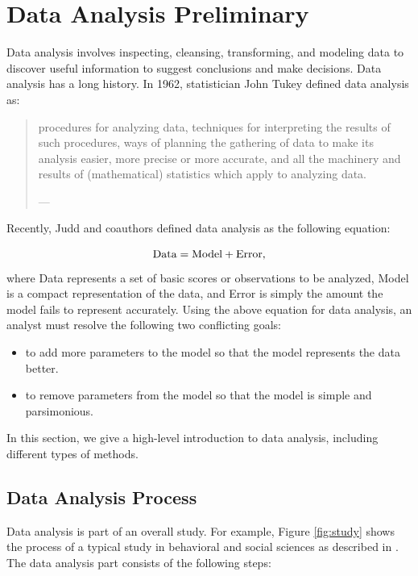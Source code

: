 \documentclass[]{book}
\providecommand{\tightlist}{%
  \setlength{\itemsep}{0pt}\setlength{\parskip}{0pt}}
\theoremstyle{definition}
\theoremstyle{definition}
\theoremstyle{definition}
\theoremstyle{remark}
\begin{document}
\section{Data Analysis Preliminary}\label{data-analysis-preliminary}

Data analysis involves inspecting, cleansing, transforming, and modeling
data to discover useful information to suggest conclusions and make
decisions. Data analysis has a long history. In 1962, statistician John
Tukey defined data analysis as:

\begin{quote}
procedures for analyzing data, techniques for interpreting the results
of such procedures, ways of planning the gathering of data to make its
analysis easier, more precise or more accurate, and all the machinery
and results of (mathematical) statistics which apply to analyzing data.

--- \citep{tukey1962data}
\end{quote}

Recently, Judd and coauthors defined data analysis as the following
equation\citep{judd2017}:

\[\hbox{Data} = \hbox{Model} + \hbox{Error},\] where Data represents a
set of basic scores or observations to be analyzed, Model is a compact
representation of the data, and Error is simply the amount the model
fails to represent accurately. Using the above equation for data
analysis, an analyst must resolve the following two conflicting goals:

\begin{itemize}
\tightlist
\item
  to add more parameters to the model so that the model represents the
  data better.
\item
  to remove parameters from the model so that the model is simple and
  parsimonious.
\end{itemize}

In this section, we give a high-level introduction to data analysis,
including different types of methods.

\subsection{Data Analysis Process}\label{S:process}

Data analysis is part of an overall study. For example, Figure
\ref{fig:study} shows the process of a typical study in behavioral and
social sciences as described in \citep{albers2017}. The data analysis
part consists of the following steps:
\end{document}
